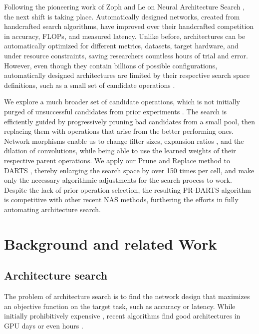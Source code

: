 \documentclass[conference]{IEEEtran}
\begin{document}
Following the pioneering work of Zoph and Le on Neural Architecture Search \cite{nas}, the next shift is taking place.
Automatically designed networks, created from handcrafted search algorithms, have improved over their handcrafted competition in accuracy, FLOPs, and measured latency.
Unlike before, architectures can be automatically optimized for different metrics, datasets, target hardware, and under resource constraints, saving researchers countless hours of trial and error.
However, even though they contain billions of possible configurations, automatically designed architectures are limited by their respective search space definitions, such as a small set of candidate operations \cite{nas_trans, nas_evo, nas_prog, nas_enas, nas_darts, nas_sharp, nas_bench, nas_pdarts, nas_mde, nas_asap}.

We explore a much broader set of candidate operations, which is not initially purged of unsuccessful candidates from prior experiments \cite{nas_trans, nas_evo}.
The search is efficiently guided by progressively pruning bad candidates from a small pool, then replacing them with operations that arise from the better performing ones.
Network morphisms \cite{morph} enable us to change filter sizes, expansion ratios \cite{net_mobv2}, and the dilation of convolutions, while being able to use the learned weights of their respective parent operations.
We apply our Prune and Replace method to DARTS \cite{nas_darts}, thereby enlarging the search space by over 150 times per cell, and make only the necessary algorithmic adjustments for the search process to work. Despite the lack of prior operation selection, the resulting PR-DARTS algorithm is competitive with other recent NAS methods, furthering the efforts in fully automating architecture search.






\section{Background and related Work}
\label{s_related_work}


\subsection{Architecture search}
\label{ss_rel_nas}

The problem of architecture search is to find the network design that maximizes an objective function on the target task, such as accuracy or latency.
While initially prohibitively expensive \cite{nas, nas_trans, nas_evo, nas_prog}, recent algorithms find good architectures in GPU days or even hours \cite{nas_enas, nas_darts, nas_sharp, nas_mde, nas_asap, nas_pdarts}.
\end{document}
